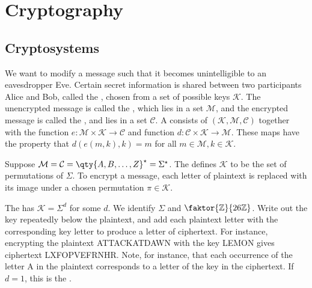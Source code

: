 \section{Cryptography}

\subsection{Cryptosystems}
We want to modify a message such that it becomes unintelligible to an eavesdropper Eve.
Certain secret information is shared between two participants Alice and Bob, called the , chosen from a set of possible keys $\mathcal K$.
The unencrypted message is called the , which lies in a set $\mathcal M$, and the encrypted message is called the , and lies in a set $\mathcal C$.
A  consists of $(\mathcal K, \mathcal M, \mathcal C)$ together with the  function $e \colon \mathcal M \times \mathcal K \to \mathcal C$ and  function $d \colon \mathcal C \times \mathcal K \to \mathcal M$.
These maps have the property that $d(e(m, k), k) = m$ for all $m \in \mathcal M, k \in \mathcal K$.
\begin{example}
    Suppose $\mathcal M = \mathcal C = \qty{A, B, \dots, Z}^\star = \Sigma^\star$.
    The  defines $\mathcal K$ to be the set of permutations of $\Sigma$.
    To encrypt a message, each letter of plaintext is replaced with its image under a chosen permutation $\pi \in \mathcal K$.

    The  has $\mathcal K = \Sigma^d$ for some $d$.
    We identify $\Sigma$ and $\faktor{\mathbb Z}{26\mathbb Z}$.
    Write out the key repeatedly below the plaintext, and add each plaintext letter with the corresponding key letter to produce a letter of ciphertext.
    For instance, encrypting the plaintext ATTACKATDAWN with the key LEMON gives ciphertext LXFOPVEFRNHR.
    Note, for instance, that each occurrence of the letter A in the plaintext corresponds to a letter of the key in the ciphertext.
    If $d = 1$, this is the .
\end{example}

